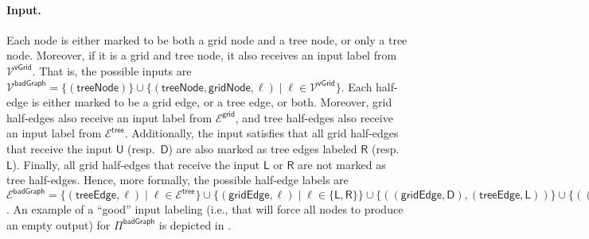 \documentclass[11pt]{article}
\newcommand{\lleft}{\mathsf {L}}
\newcommand{\lright}{\mathsf {R}}
\newcommand{\lup}{\mathsf {U}}
\newcommand{\ldown}{\mathsf {D}}
\newcommand{\lgridedge}{\mathsf {gridEdge}}
\newcommand{\lgridnode}{\mathsf {gridNode}}
\newcommand{\ltreenode}{\mathsf {treeNode}}
\newcommand{\ltreeedge}{\mathsf {treeEdge}}
\newcommand{\lgrid}{\mathsf {grid}}
\newcommand{\lvgrid}{\mathsf {vGrid}}
\newcommand{\ltreelike}{\mathsf {tree}}
\newcommand{\lbadgraph}{\mathsf {badGraph}}
\begin{document}
\paragraph{Input.}
Each node is either marked to be both a grid node and a tree node, or only a tree node. Moreover, if it is a grid and tree node, it also receives an input label from $\mathcal{V}^{\lvgrid}$. That is, the possible inputs are $\mathcal{V^\lbadgraph} = \{ (\ltreenode)\} \cup \{(\ltreenode,\lgridnode,\ell) \mid  \ell \in \mathcal{V}^{\lvgrid}\}$. Each half-edge is either marked to be a grid edge, or a tree edge, or both. Moreover, grid half-edges also receive an input label from $\mathcal{E}^{\lgrid}$, and tree half-edges also receive an input label from $\mathcal{E}^{\ltreelike}$. Additionally, the input satisfies that all grid half-edges that receive the input $\lup$ (resp.\ $\ldown$) are also marked as tree edges labeled $\lright$ (resp.\ $\lleft$). Finally, all grid half-edges that receive the input $\lleft$ or $\lright$ are not marked as tree half-edges.
Hence, more formally, the possible half-edge labels are $\mathcal{E^\lbadgraph} = 
\{(\ltreeedge,\ell) \mid \ell \in \mathcal{E}^{\ltreelike}\} \cup 
\{(\lgridedge,\ell) \mid \ell \in  \{\lleft,\lright\}\} \cup
\{((\lgridedge,\ldown),(\ltreeedge,\lleft))\} \cup
\{((\lgridedge,\lup),(\ltreeedge,\lright))\}
$. An example of a ``good'' input labeling (i.e., that will force all nodes to produce an empty output) for $\Pi^{\lbadgraph}$ is depicted in .
\end{document}
